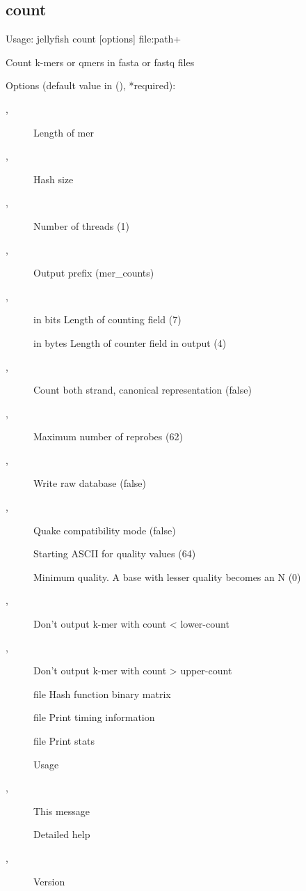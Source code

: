 \subsection{count}
\noindent Usage: jellyfish count [options] file:path+

\noindent Count k-mers or qmers in fasta or fastq files

\noindent Options (default value in (), *required):
\begin{description}
\item[,] \noindent *Length of mer
\item[,] \noindent *Hash size
\item[,] \noindent Number of threads (1)
\item[,] \noindent Output prefix (mer\_counts)
\item[,] \noindent in bits         Length of counting field (7)
\item[] \noindent in bytes    Length of counter field in output (4)
\item[,] \noindent Count both strand, canonical representation (false)
\item[,] \noindent Maximum number of reprobes (62)
\item[,] \noindent Write raw database (false)
\item[,] \noindent Quake compatibility mode (false)
\item[] \noindent Starting ASCII for quality values (64)
\item[] \noindent Minimum quality. A base with lesser quality becomes an N (0)
\item[,] \noindent Don't output k-mer with count < lower-count
\item[,] \noindent Don't output k-mer with count > upper-count
\item[] \noindent file                 Hash function binary matrix
\item[] \noindent file                 Print timing information
\item[] \noindent file                   Print stats
\item[] \noindent Usage
\item[,] \noindent This message
\item[] \noindent Detailed help
\item[,] \noindent Version
\end{description}
